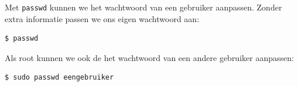 Met \texttt{passwd} kunnen we het wachtwoord van een gebruiker aanpassen. Zonder extra informatie passen we ons eigen wachtwoord aan:
\begin{lstlisting}[language=bash]
$ passwd
\end{lstlisting}

Als root kunnen we ook de het wachtwoord van een andere gebruiker aanpassen:
\begin{lstlisting}[language=bash]
$ sudo passwd eengebruiker
\end{lstlisting}


